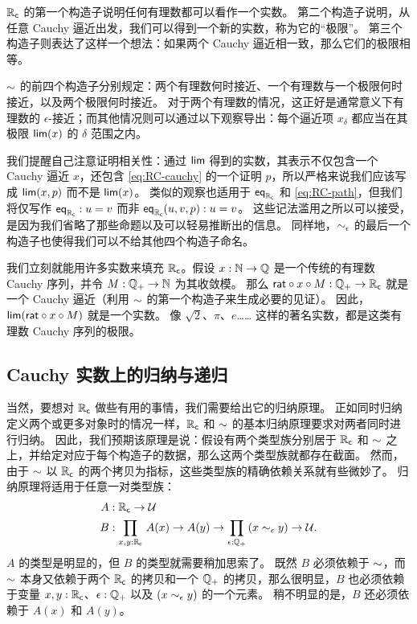 \mentalpause

$\mathbb{R}_\mathsf{c}$ 的第一个构造子说明任何有理数都可以看作一个实数。
第二个构造子说明，从任意 Cauchy 逼近出发，我们可以得到一个新的实数，称为它的“极限”。
第三个构造子则表达了这样一个想法：如果两个 Cauchy 逼近相一致，那么它们的极限相等。

$\mathord\sim$ 的前四个构造子分别规定：两个有理数何时接近、一个有理数与一个极限何时接近，以及两个极限何时接近。
对于两个有理数的情况，这正好是通常意义下有理数的 $\epsilon$-接近；而其他情况则可以通过以下观察导出：每个逼近项 $x_\delta$ 都应当在其极限 $\mathsf{lim}(x)$ 的 $\delta$ 范围之内。

我们提醒自己注意证明相关性：通过 $\mathsf{lim}$ 得到的实数，其表示不仅包含一个 Cauchy 逼近 $x$，还包含 \eqref{eq:RC-cauchy} 的一个证明 $p$，所以严格来说我们应该写成 $\mathsf{lim}(x,p)$ 而不是 $\mathsf{lim}(x)$。
类似的观察也适用于 $\mathsf{eq}_{\mathbb{R}_\mathsf{c}}$ 和 \eqref{eq:RC-path}，但我们将仅写作 $\mathsf{eq}_{\mathbb{R}_\mathsf{c}} : u = v$ 而非 $\mathsf{eq}_{\mathbb{R}_\mathsf{c}}(u, v, p) : u = v$。
这些记法滥用之所以可以接受，是因为我们省略了那些命题以及可以轻易推断出的信息。
同样地，$\mathord{\sim_{\epsilon}}$ 的最后一个构造子也使得我们可以不给其他四个构造子命名。

我们立刻就能用许多实数来填充 $\mathbb{R}_\mathsf{c}$。假设 $x : \mathbb{N} \to
\mathbb{Q}$ 是一个传统的有理数 Cauchy 序列，并令 $M : \mathbb{Q}_{+} \to \mathbb{N}$ 为其收敛模。
那么 $\mathsf{rat} \circ x \circ M : \mathbb{Q}_{+} \to \mathbb{R}_\mathsf{c}$ 就是一个 Cauchy 逼近（利用 $\mathord\sim$ 的第一个构造子来生成必要的见证）。
因此，$\mathsf{lim}(\mathsf{rat} \circ x \circ M)$ 就是一个实数。
像 $\sqrt{2}$、$\pi$、$e$…… 这样的著名实数，都是这类有理数 Cauchy 序列的极限。

\subsection{Cauchy 实数上的归纳与递归}
\label{sec:induct-recurs-cauchy}

当然，要想对 $\mathbb{R}_\mathsf{c}$ 做些有用的事情，我们需要给出它的归纳原理。
正如同时归纳定义两个或更多对象时的情况一样，$\mathbb{R}_\mathsf{c}$ 和 $\mathord\sim$ 的基本归纳原理要求对两者同时进行归纳。
因此，我们预期该原理是说：假设有两个类型族分别居于 $\mathbb{R}_\mathsf{c}$ 和 $\mathord\sim$ 之上，并给定对应于每个构造子的数据，那么这两个类型族就都存在截面。
然而，由于 $\mathord\sim$ 以 $\mathbb{R}_\mathsf{c}$ 的两个拷贝为指标，这些类型族的精确依赖关系就有些微妙了。
归纳原理将适用于任意一对类型族：
\begin{align*}
A&:\RC\to\type\\
B&:\prd{x,y:\RC} A(x) \to A(y) \to \prd{\epsilon:\Qp} (x\close\epsilon y) \to \type.
\end{align*}
$A$ 的类型是明显的，但 $B$ 的类型就需要稍加思索了。
既然 $B$ 必须依赖于 $\mathord\sim$，而 $\mathord\sim$ 本身又依赖于两个 $\mathbb{R}_\mathsf{c}$ 的拷贝和一个 $\mathbb{Q}_{+}$ 的拷贝，那么很明显，$B$ 也必须依赖于变量 $x,y:\mathbb{R}_\mathsf{c}$、$\epsilon:\mathbb{Q}_{+}$ 以及 $(x\sim_{\epsilon} y)$ 的一个元素。
稍不明显的是，$B$ 还必须依赖于 $A(x)$ 和 $A(y)$。

